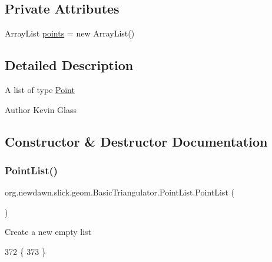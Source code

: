 \subsection*{Private Attributes}
\begin{DoxyCompactItemize}
\item 
Array\+List \mbox{\hyperlink{classorg_1_1newdawn_1_1slick_1_1geom_1_1_basic_triangulator_1_1_point_list_afc89fd9387b7c0663eda4f928e610b8a}{points}} = new Array\+List()
\end{DoxyCompactItemize}


\subsection{Detailed Description}
A list of type {\ttfamily \mbox{\hyperlink{classorg_1_1newdawn_1_1slick_1_1geom_1_1_basic_triangulator_1_1_point}{Point}}}

\begin{DoxyAuthor}{Author}
Kevin Glass 
\end{DoxyAuthor}


\subsection{Constructor \& Destructor Documentation}
\mbox{\label{classorg_1_1newdawn_1_1slick_1_1geom_1_1_basic_triangulator_1_1_point_list_a2647a2f8f8fab306fcbfadd4b9e31cf7}} 
\subsubsection{\texorpdfstring{Point\+List()}{PointList()}}
{\footnotesize\ttfamily org.\+newdawn.\+slick.\+geom.\+Basic\+Triangulator.\+Point\+List.\+Point\+List (\begin{DoxyParamCaption}{ }\end{DoxyParamCaption})\hspace{0.3cm}{\ttfamily [inline]}}

Create a new empty list 
\begin{DoxyCode}
372                            \{
373         \}
\end{DoxyCode}


